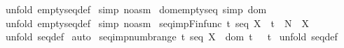 \begin{isabellebody}
%
\isadelimproof
%
\endisadelimproof
%
\isatagproof
{}\isamarkupfalse%
\ {\isacharparenleft}unfold\ emptyseq{\isacharunderscore}def{\isacharparenright}\isanewline
{}\isamarkupfalse%
\ {\isacharparenleft}simp\ {\isacharparenleft}no{\isacharunderscore}asm{\isacharparenright}{\isacharparenright}\isanewline
{}\isamarkupfalse%
%
\endisatagproof
{\isafoldproof}%
%
\isadelimproof
\isanewline
%
\endisadelimproof
\isanewline
{}\isamarkupfalse%
\ dom{\isacharunderscore}emptyseq\ {\isacharbrackleft}simp{\isacharbrackright}{\isacharcolon}\ {\isachardoublequoteopen}dom\ {\isacharparenleft}{\isacharpercent}{\isacharless}{\isacharpercent}{\isachargreater}{\isacharparenright}\ {\isacharequal}\ {\isacharbraceleft}{\isacharbraceright}{\isachardoublequoteclose}\isanewline
%
\isadelimproof
%
\endisadelimproof
%
\isatagproof
{}\isamarkupfalse%
\ {\isacharparenleft}unfold\ emptyseq{\isacharunderscore}def{\isacharparenright}\isanewline
{}\isamarkupfalse%
\ {\isacharparenleft}simp\ {\isacharparenleft}no{\isacharunderscore}asm{\isacharparenright}{\isacharparenright}\isanewline
{}\isamarkupfalse%
%
\endisatagproof
{\isafoldproof}%
%
\isadelimproof
\isanewline
%
\endisadelimproof
\isanewline
{}\isamarkupfalse%
\ seq{\isacharunderscore}imp{\isacharunderscore}Fin{\isacharunderscore}func{\isacharcolon}\ {\isachardoublequoteopen}t{\isacharcolon}\ seq\ X\ {\isacharminus}{\isacharminus}{\isachargreater}\ t\ {\isacharcolon}\ {\isacharparenleft}{\isacharpercent}N\ {\isacharminus}{\isacharbar}{\isacharbar}{\isacharminus}{\isachargreater}\ X{\isacharparenright}{\isachardoublequoteclose}\isanewline
%
\isadelimproof
%
\endisadelimproof
%
\isatagproof
{}\isamarkupfalse%
\ {\isacharparenleft}unfold\ seq{\isacharunderscore}def{\isacharparenright}\isanewline
{}\isamarkupfalse%
\ auto\isanewline
{}\isamarkupfalse%
%
\endisatagproof
{\isafoldproof}%
%
\isadelimproof
\isanewline
%
\endisadelimproof
\isanewline
{}\isamarkupfalse%
\ seq{\isacharunderscore}imp{\isacharunderscore}numb{\isacharunderscore}range{\isacharcolon}\ {\isachardoublequoteopen}t{\isacharcolon}\ seq\ X\ {\isacharequal}{\isacharequal}{\isachargreater}\ {\isacharparenleft}dom\ t{\isacharparenright}\ {\isacharequal}\ {\isacharparenleft}{}\ {\isachardot}{\isachardot}{\isacharhash}t{\isacharparenright}{\isachardoublequoteclose}\isanewline
%
\isadelimproof
%
\endisadelimproof
%
\isatagproof
{}\isamarkupfalse%
\ {\isacharparenleft}unfold\ seq{\isacharunderscore}def{\isacharparenright}\isanewline

\end{isabellebody}
